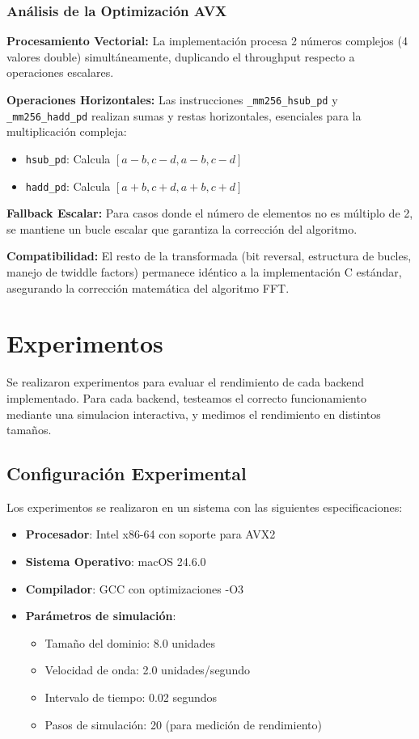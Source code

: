 \documentclass[a4paper]{article}
\begin{document}
\subsubsection{Análisis de la Optimización AVX}

\textbf{Procesamiento Vectorial:} La implementación procesa 2 números complejos (4 valores double) simultáneamente, duplicando el throughput respecto a operaciones escalares.

\textbf{Operaciones Horizontales:} Las instrucciones \texttt{\_mm256\_hsub\_pd} y \texttt{\_mm256\_hadd\_pd} realizan sumas y restas horizontales, esenciales para la multiplicación compleja:
\begin{itemize}
    \item \texttt{hsub\_pd}: Calcula $[a-b, c-d, a-b, c-d]$
    \item \texttt{hadd\_pd}: Calcula $[a+b, c+d, a+b, c+d]$
\end{itemize}

\textbf{Fallback Escalar:} Para casos donde el número de elementos no es múltiplo de 2, se mantiene un bucle escalar que garantiza la corrección del algoritmo.

\textbf{Compatibilidad:} El resto de la transformada (bit reversal, estructura de bucles, manejo de twiddle factors) permanece idéntico a la implementación C estándar, asegurando la corrección matemática del algoritmo FFT.

\section{Experimentos}

Se realizaron experimentos para evaluar el rendimiento de cada backend implementado. Para cada backend, testeamos el correcto funcionamiento mediante una simulacion interactiva, y medimos
el rendimiento en distintos tamaños.

\subsection{Configuración Experimental}

Los experimentos se realizaron en un sistema con las siguientes especificaciones:
\begin{itemize}
    \item \textbf{Procesador}: Intel x86-64 con soporte para AVX2
    \item \textbf{Sistema Operativo}: macOS 24.6.0
    \item \textbf{Compilador}: GCC con optimizaciones -O3
    \item \textbf{Parámetros de simulación}:
          \begin{itemize}
              \item Tamaño del dominio: 8.0 unidades
              \item Velocidad de onda: 2.0 unidades/segundo
              \item Intervalo de tiempo: 0.02 segundos
              \item Pasos de simulación: 20 (para medición de rendimiento)
          \end{itemize}
\end{itemize}
\end{document}
